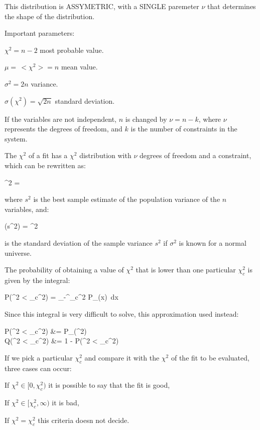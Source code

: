 This distribution is ASSYMETRIC, with a SINGLE paremeter $\nu$ that determines the shape of the distribution.

Important parameters:
	\bi
		\item $\chi^2 = n - 2$ most probable value.
		\item $\mu = \,<\chi^2> = n$ mean value.
		\item $\sigma^2 = 2n$ variance.
		\item $\sigma(\chi^2) = \sqrt{2n}$ standard deviation.
	\ei

If the variables are not independent, $n$ is changed by $\nu = n - k$, where $\nu$ represents the degrees of freedom, and $k$ is the number of constraints in the system.

The $\chi^2$ of a fit has a $\chi^2$ distribution with $\nu$ degrees of freedom and a constraint, which can be rewritten as:

	\be\chi^2 = \ee

where $s^2$ is the best sample estimate of the population variance of the $n$ variables, and:

	\be \sigma(s^2) =  \sigma^2 \ee

is the standard deviation of the sample variance $s^2$ if $\sigma^2$ is known for a normal universe.

The probability of obtaining a value of $\chi^2$ that is lower than one particular $\chi_c^2$ is given by the integral:

	\be
		P\left(\chi^2 < \chi_c^2\right) =
		\int_{-\infty}^{\chi_c^2} P_\nu(x) \,dx
	\ee

Since this integral is very difficult to solve, this approximation used instead:

	\be
		\begin{split}
			P\left(\chi^2 < \chi_c^2\right) &=  P_\nu(\chi^2)
			\left[1 + \sum_{k=1}^\infty \frac{\chi^{2k}}{(\nu + 2)(\nu + 4)\dots(\nu + 2k)}\right]\\[12pt]
			Q\left(\chi^2 < \chi_c^2\right) &= 1 - P(\chi^2 < \chi_c^2)
		\end{split}
	\ee

If we pick a particular $\chi_c^2$ and compare it with the $\chi^2$ of the fit to be evaluated, three cases can occur:

\bi
	\item If $\chi^2 \in [0, \chi_c^2)$ it is possible to say that the fit is good,
	\item If $\chi^2 \in [\chi_c^2, \infty)$ it is bad,
	\item If $\chi^2 = \chi_c^2$ this criteria doesn not decide.
\ei


